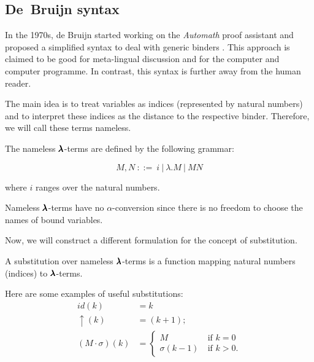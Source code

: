 
\subsection{De~Bruijn syntax}

In the 1970s, de Bruijn started working on the \textit{Automath} proof assistant and proposed a simplified syntax to deal with generic binders \cite{deBruijn}.
This approach is claimed to be good for meta-lingual discussion and for the computer and computer programme. In contrast, this syntax is further away from the human reader.

The main idea is to treat variables as indices (represented by natural numbers) and to interpret these indices as the distance to the respective binder.
Therefore, we will call these terms nameless. 

\begin{definition}
  The nameless $\pmb{\lambda}$-terms are defined by the following grammar:

  \[ M, N \ ::= \ i \ | \ \lambda . M \ | \ M N \]

  where $i$ ranges over the natural numbers.
\end{definition}

\begin{remark}
  Nameless $\pmb{\lambda}$-terms have no $\alpha$-conversion since there is no freedom to choose the names of bound variables.
\end{remark}

Now, we will construct a different formulation for the concept of substitution.

\begin{definition}[Substitution]
  A substitution over nameless $\pmb{\lambda}$-terms is a function mapping natural numbers (indices) to $\pmb{\lambda}$-terms.
\end{definition}

Here are some examples of useful substitutions:
\begin{align*}
  id(k) &= k \\
  \uparrow(k) &= (k+1); \\
  (M \cdot \sigma)(k) &=
                        \begin{cases}
                          M & \ \text{if $k = 0$} \\
                          \sigma(k-1) & \ \text{if $k > 0$}.
                        \end{cases}
\end{align*}

